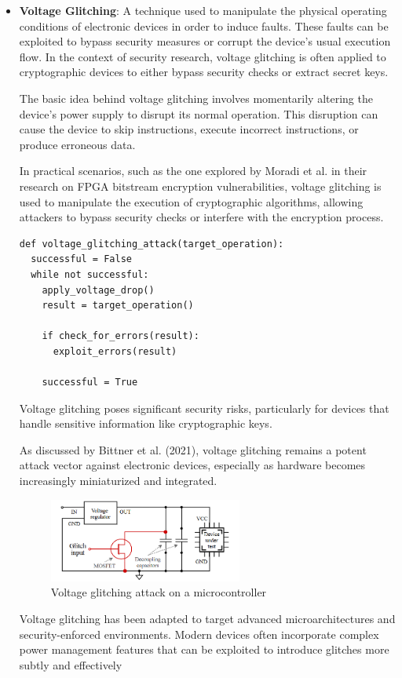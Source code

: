 \begin{itemize}
\item \textbf{Voltage Glitching}: A technique used to manipulate the physical operating conditions of electronic devices in order to induce faults. These faults can be exploited to bypass security measures or corrupt the device's usual execution flow. In the context of security research, voltage glitching is often applied to cryptographic devices to either bypass security checks or extract secret keys.

The basic idea behind voltage glitching involves momentarily altering the device's power supply to disrupt its normal operation. This disruption can cause the device to skip instructions, execute incorrect instructions, or produce erroneous data.\cite{bar-elSorcererApprenticeGuide2004}

In practical scenarios, such as the one explored by Moradi et al.\cite{moradiVulnerabilityFPGABitstream2011} in their research on FPGA bitstream encryption vulnerabilities, voltage glitching is used to manipulate the execution of cryptographic algorithms, allowing attackers to bypass security checks or interfere with the encryption process.\\

\begin{verbatim}
def voltage_glitching_attack(target_operation):
  successful = False
  while not successful:
    apply_voltage_drop()
    result = target_operation()
    
    if check_for_errors(result):
      exploit_errors(result)

    successful = True
\end{verbatim}

Voltage glitching poses significant security risks, particularly for devices that handle sensitive information like cryptographic keys.

As discussed by Bittner et al. (2021)\cite{bittnerForgottenThreatVoltage2021}, voltage glitching remains a potent attack vector against electronic devices, especially as hardware becomes increasingly miniaturized and integrated.

\begin{figure}[H]
  \centering
  \includegraphics[width=0.6\textwidth]{images/glitch.png}
  \caption{Voltage glitching attack on a microcontroller\cite{bittnerForgottenThreatVoltage2021}}
  \label{fig:voltage_glitching}
\end{figure}

Voltage glitching has been adapted to target advanced microarchitectures and security-enforced environments. Modern devices often incorporate complex power management features that can be exploited to introduce glitches more subtly and effectively
\end{itemize}

